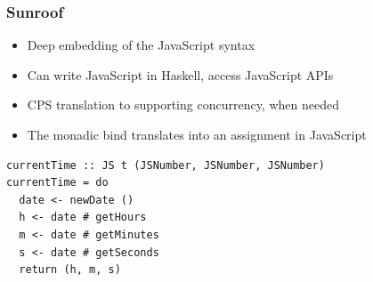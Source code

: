 \documentclass{beamer}
\begin{document}
\begin{frame}[fragile]
\frametitle{Sunroof}
\large
\begin{itemize}
\item Deep embedding of the JavaScript syntax
\item Can write JavaScript in Haskell, access JavaScript APIs
\item CPS translation to supporting concurrency, when needed
\item The monadic bind translates into an assignment in JavaScript
\end{itemize}
\begin{codeblock}[0.75]
\footnotesize
\begin{verbatim}
currentTime :: JS t (JSNumber, JSNumber, JSNumber)
currentTime = do
  date <- newDate ()
  h <- date # getHours
  m <- date # getMinutes
  s <- date # getSeconds
  return (h, m, s)
\end{verbatim}
\end{codeblock}
\end{frame}
\end{document}
